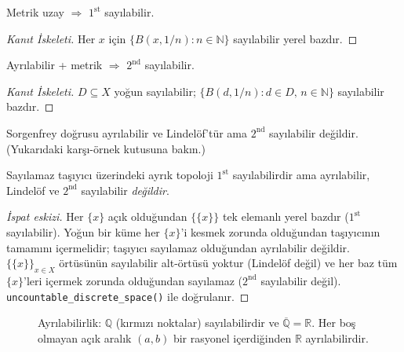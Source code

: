 \begin{theorem}
Metrik uzay $\Rightarrow$ $1^{\text{st}}$ sayılabilir.
\begin{proof}[Kanıt İskeleti]
Her $x$ için $\{B(x, 1/n) : n \in \mathbb{N}\}$ sayılabilir yerel bazdır.
\end{proof}
\end{theorem}

\begin{theorem}
Ayrılabilir + metrik $\Rightarrow$ $2^{\text{nd}}$ sayılabilir.
\begin{proof}[Kanıt İskeleti]
$D \subseteq X$ yoğun sayılabilir; $\{B(d, 1/n) : d \in D,\, n \in \mathbb{N}\}$ sayılabilir bazdır.
\end{proof}
\end{theorem}

\begin{theorem}
Sorgenfrey doğrusu ayrılabilir ve Lindelöf'tür ama $2^{\text{nd}}$ sayılabilir
değildir. (Yukarıdaki karşı-örnek kutusuna bakın.)
\end{theorem}

\begin{theorem}
Sayılamaz taşıyıcı üzerindeki ayrık topoloji $1^{\text{st}}$ sayılabilirdir ama
ayrılabilir, Lindelöf ve $2^{\text{nd}}$ sayılabilir \emph{değildir}.
\begin{proof}[İspat eskizi]
Her $\{x\}$ açık olduğundan $\{\{x\}\}$ tek elemanlı yerel bazdır
($1^{\text{st}}$ sayılabilir). Yoğun bir küme her $\{x\}$'i kesmek zorunda olduğundan
taşıyıcının tamamını içermelidir; taşıyıcı sayılamaz olduğundan ayrılabilir değildir.
$\{\{x\}\}_{x\in X}$ örtüsünün sayılabilir alt-örtüsü yoktur (Lindelöf değil) ve her
baz tüm $\{x\}$'leri içermek zorunda olduğundan sayılamaz ($2^{\text{nd}}$ sayılabilir
değil). \texttt{uncountable\_discrete\_space()} ile doğrulanır.
\end{proof}
\end{theorem}

\begin{figure}[ht]
  \centering
  
  \caption{Ayrılabilirlik: $\mathbb{Q}$ (kırmızı noktalar) sayılabilirdir ve
    $\overline{\mathbb{Q}}=\mathbb{R}$. Her boş olmayan açık aralık $(a,b)$ bir
    rasyonel içerdiğinden $\mathbb{R}$ ayrılabilirdir.}
  \label{fig:ch09:ayrilabilirlik}
\end{figure}

